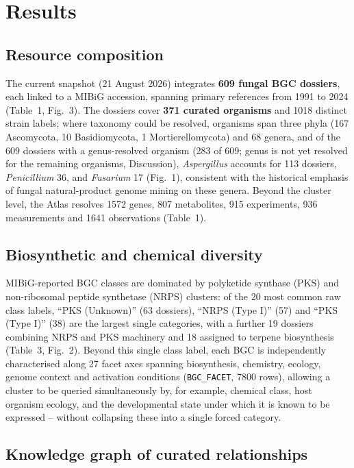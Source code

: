 \section{Results}

\subsection{Resource composition}

The current snapshot (21 August 2026) integrates \textbf{609 fungal BGC dossiers}, each linked to a
MIBiG accession, spanning primary references from 1991 to 2024 (Table~1, Fig.~3). The dossiers cover
\textbf{371 curated organisms} and 1018 distinct strain labels; where taxonomy could be resolved,
organisms span three phyla (167 Ascomycota, 10 Basidiomycota, 1 Mortierellomycota) and 68 genera, and
of the 609 dossiers with a genus-resolved organism (283 of 609; genus is not yet resolved for the
remaining organisms, Discussion), \textit{Aspergillus} accounts for 113 dossiers, \textit{Penicillium}
36, and \textit{Fusarium} 17 (Fig.~1), consistent with the historical emphasis of fungal
natural-product genome mining on these genera. Beyond the cluster level, the Atlas resolves 1572
genes, 807 metabolites, 915 experiments, 936 measurements and 1641 observations (Table~1).



\subsection{Biosynthetic and chemical diversity}

MIBiG-reported BGC classes are dominated by polyketide synthase (PKS) and non-ribosomal peptide
synthetase (NRPS) clusters: of the 20 most common raw class labels, ``PKS (Unknown)'' (63 dossiers),
``NRPS (Type I)'' (57) and ``PKS (Type I)'' (38) are the largest single categories, with a further 19
dossiers combining NRPS and PKS machinery and 18 assigned to terpene biosynthesis (Table~3, Fig.~2).
Beyond this single class label, each BGC is independently characterised along 27 facet axes spanning
biosynthesis, chemistry, ecology, genome context and activation conditions (\texttt{BGC\_FACET}, 7800
rows), allowing a cluster to be queried simultaneously by, for example, chemical class, host
organism ecology, and the developmental state under which it is known to be expressed -- without
collapsing these into a single forced category.

\subsection{Knowledge graph of curated relationships}

